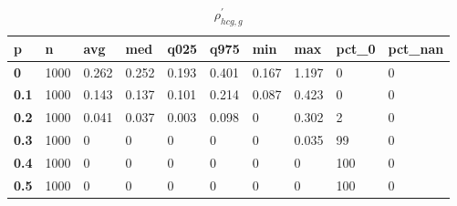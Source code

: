 \begin{table}[h]
 \centering 
\footnotesize
\caption{$\rho_{hcg,g}^\prime $}
\label{tab:alphahcgg}
\begin{tabular}[h]{|l|l|l|l|l|l|l|l|l|l|
    } \hline
\textbf{ p} & \textbf{ n} & \textbf{ avg} & \textbf{ med} & \textbf{ q025} & \textbf{ q975} & \textbf{ min} & \textbf{ max} & \textbf{ pct\_0} & \textbf{ pct\_nan}
    \\ \hline
  \textbf{  0} & 1000 & 0.262 & 0.252 & 0.193 & 0.401 & 0.167 & 1.197 &   0 & 0
    \\ \hline
  \textbf{0.1} & 1000 & 0.143 & 0.137 & 0.101 & 0.214 & 0.087 & 0.423 &   0 & 0
    \\ \hline
  \textbf{0.2} & 1000 & 0.041 & 0.037 & 0.003 & 0.098 &     0 & 0.302 &   2 & 0
    \\ \hline
  \textbf{0.3} & 1000 &     0 &     0 &     0 &     0 &     0 & 0.035 &  99 & 0
    \\ \hline
  \textbf{0.4} & 1000 &     0 &     0 &     0 &     0 &     0 &     0 & 100 & 0
    \\ \hline
  \textbf{0.5} & 1000 &     0 &     0 &     0 &     0 &     0 &     0 & 100 & 0
    \\ \hline
 \end{tabular}
 \end{table}
